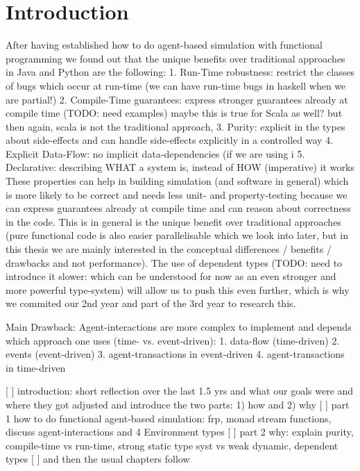 \chapter{Introduction}
\label{chap:intro}

After having established how to do agent-based simulation with functional programming we found out that the unique benefits over traditional approaches in Java and Python are the following:
1. Run-Time robustness: restrict the classes of bugs which occur at run-time (we can have run-time bugs in haskell when we are partial!)
2. Compile-Time guarantees: express stronger guarantees already at compile time (TODO: need examples) maybe this is true for Scala as well? but then again, scala is not the traditional approach,
3. Purity: explicit in the types about side-effects and can handle side-effects explicitly in a controlled way
4. Explicit Data-Flow: no implicit data-dependencies (if we are using i
5. Declarative: describing WHAT a system is, instead of HOW (imperative) it works
These properties can help in building simulation (and software in general) which is more likely to be correct and needs less unit- and property-testing because we can express guarantees already at compile time and can reason about correctness in the code. This is in general is the unique benefit over traditional approaches (pure functional code is also easier parallelisable which we look into later, but in this thesis we are mainly interested in the conceptual differences / benefits / drawbacks and not performance). The use of dependent types (TODO: need to introduce it slower: which can be understood for now as an even stronger and more powerful type-system) will allow us to push this even further, which is why we commited our 2nd year and part of the 3rd year to research this.

Main Drawback: Agent-interactions are more complex to implement and depends which approach one uses (time- vs. event-driven):
1. data-flow (time-driven)
2. events (event-driven)
3. agent-transactions in event-driven
4. agent-transactions in time-driven


[ ] introduction: short reflection over the last 1.5 yrs and what our goals were and where they got adjusted and introduce the two parts: 1) how and 2) why
[ ] part 1 how to do functional agent-based simulation: frp, monad stream functions, discuss agent-interactions and 4 Environment types
[ ] part 2 why: explain purity, compile-time vs run-time, strong static type syst vs weak dynamic, dependent types
[ ] and then the usual chapters follow

